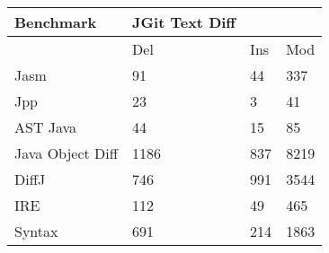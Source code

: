 \begin{table}
    \begin{tabular}{l|lll}
    Benchmark        & JGit Text Diff & ~   & ~    \\ \hline
    ~                & Del            & Ins & Mod  \\ \hline
    Jasm             & 91             & 44  & 337  \\
    Jpp              & 23             & 3   & 41   \\
    AST Java         & 44             & 15  & 85   \\
    Java Object Diff & 1186           & 837 & 8219 \\
    DiffJ            & 746            & 991 & 3544 \\
    IRE              & 112            & 49  & 465  \\
    Syntax           & 691            & 214 & 1863 \\
    \end{tabular}
\end{table}
% 
% 
% 
